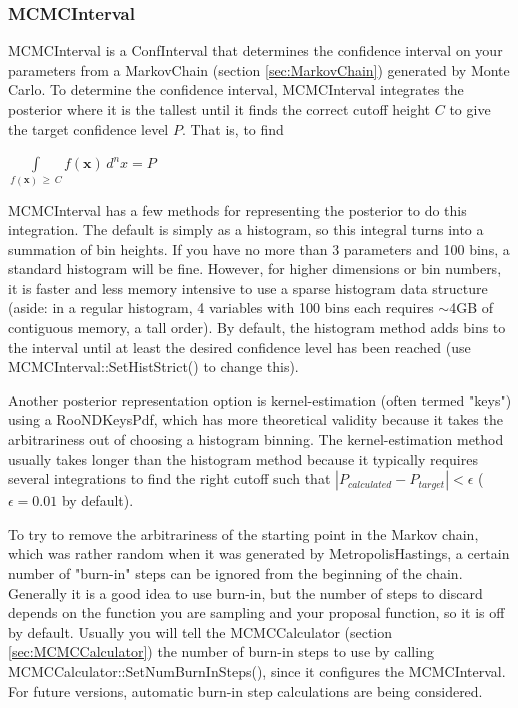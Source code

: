 \documentclass[11pt]{article}
\begin{document}
	\subsubsection{MCMCInterval}
	\label{sec:MCMCInterval}
	MCMCInterval is a ConfInterval that determines the confidence interval on your parameters from a MarkovChain (section \ref{sec:MarkovChain}) generated by Monte Carlo.  To determine the confidence interval, MCMCInterval integrates the posterior where it is the tallest until it finds the correct cutoff height $C$ to give the target confidence level $P$.  That is, to find
	\begin{center}
	$\displaystyle \int\limits_{f(\mathbf{x}) \, \ge \, C} f(\mathbf{x}) \,d^nx = P$
	\end{center}
	MCMCInterval has a few methods for representing the posterior to do this integration.  The default is simply as a histogram, so this integral turns into a summation of bin heights.  If you have no more than 3 parameters and 100 bins, a standard histogram will be fine.  However, for higher dimensions or bin numbers, it is faster and less memory intensive to use a sparse histogram data structure (aside: in a regular histogram, 4 variables with 100 bins each requires $\sim$4GB of contiguous memory, a tall order).  By default, the histogram method adds bins to the interval until at least the desired confidence level has been reached (use MCMCInterval::SetHistStrict() to change this).
	
	Another posterior representation option is kernel-estimation (often termed "keys") using a RooNDKeysPdf, which has more theoretical validity because it takes the arbitrariness out of choosing a histogram binning.  The kernel-estimation method usually takes longer than the histogram method because it typically requires several integrations to find the right cutoff such that $|P_{calculated} - P_{target}| < \epsilon$ ($\epsilon = 0.01$ by default).
	
	To try to remove the arbitrariness of the starting point in the Markov chain, which was rather random when it was generated by MetropolisHastings, a certain number of "burn-in" steps can be ignored from the beginning of the chain.  Generally it is a good idea to use burn-in, but the number of steps to discard depends on the function you are sampling and your proposal function, so it is off by default.  Usually you will tell the MCMCCalculator (section \ref{sec:MCMCCalculator}) the number of burn-in steps to use by calling MCMCCalculator::SetNumBurnInSteps(), since it configures the MCMCInterval.  For future versions, automatic burn-in step calculations are being considered.
	
\end{document}
